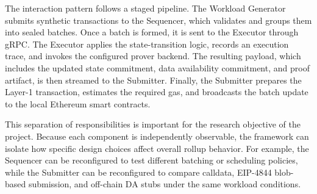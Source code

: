 The interaction pattern follows a staged pipeline. The Workload Generator submits synthetic transactions to the Sequencer, which validates and groups them into sealed batches. Once a batch is formed, it is sent to the Executor through gRPC. The Executor applies the state-transition logic, records an execution trace, and invokes the configured prover backend. The resulting payload, which includes the updated state commitment, data availability commitment, and proof artifact, is then streamed to the Submitter. Finally, the Submitter prepares the Layer-1 transaction, estimates the required gas, and broadcasts the batch update to the local Ethereum smart contracts.

This separation of responsibilities is important for the research objective of the project. Because each component is independently observable, the framework can isolate how specific design choices affect overall rollup behavior. For example, the Sequencer can be reconfigured to test different batching or scheduling policies, while the Submitter can be reconfigured to compare calldata, EIP-4844 blob-based submission, and off-chain DA stubs under the same workload conditions.

